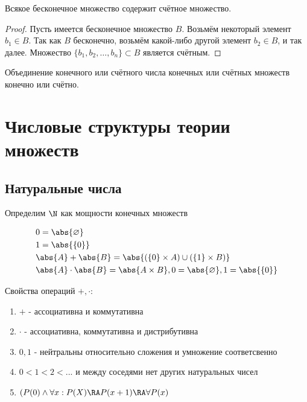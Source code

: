 \documentclass[a4paper, 14pt]{article}
\begin{document}
    \begin{theorem}
        Всякое бесконечное множество содержит счётное множество.
    \end{theorem}
    \begin{proof}
        Пусть имеется бесконечное множество $B$. Возьмём некоторый
        элемент $b_1 \in B$. Так как $B$ бесконечно, возьмём какой-либо
        другой элемент $b_2 \in B$, и так далее. Множество
        $\{b_1, b_2, \dots, b_n\} \subset B$ является счётным. 
    \end{proof}
    \begin{theorem}
        Объединение конечного или счётного числа конечных или
        счётных множеств конечно или счётно.
    \end{theorem}

    \section{Числовые структуры теории множеств}

     \subsection*{Натуральные числа}

    \begin{definition}
        Определим $\N$ как мощности конечных множеств
    \end{definition}

    \begin{align}
        &0 = \abs{\varnothing} \\
        &1 = \abs{\{0\}} \\
        &\abs{A} + \abs{B} = \abs{(\{0\} \times A) \cup (\{1\} \times B)} \\
        &\abs{A} \cdot \abs{B} = \abs{A \times B}, 0 = \abs{\varnothing}, 1 = \abs{\{0\}} 
    \end{align}

    Свойства операций $+, \cdot$:
    \begin{enumerate}
        \item $+$ - ассоциативна и коммутативна \\
        \item $\cdot$ - ассоциативна, коммутативна и дистрибутивна\\
        \item $0, 1$ - нейтральны относительно сложения и умножение соответсвенно \\
        \item $0 < 1 < 2 < ...$ и между соседями нет других натуральных чисел \\
        \item $(P(0) \land \forall x : P(X) \RA P(x+1) \RA \forall P(x)$    
    \end{enumerate}
    
\end{document}
